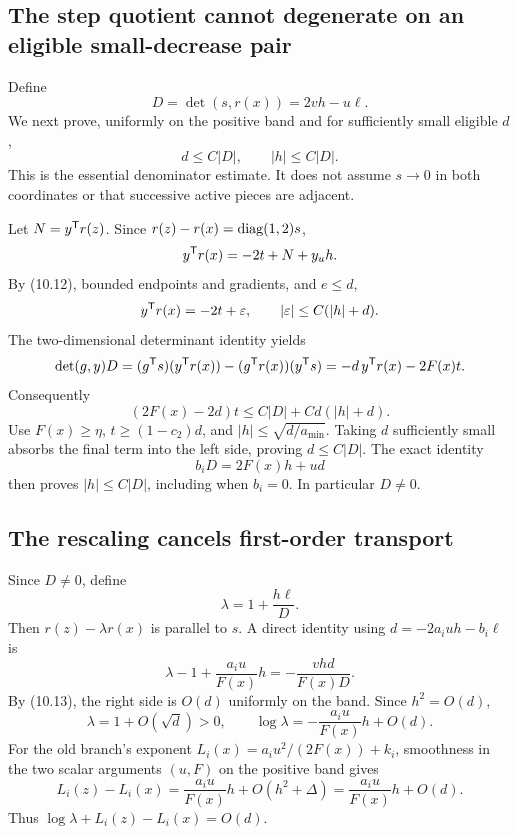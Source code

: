 

\subsection{The step quotient cannot degenerate on an eligible small-decrease pair}
Define
\[
 D=\det(s,r(x))=2vh-u\ell.
\]
We next prove, uniformly on the positive band and for sufficiently small eligible $d$,
\begin{equation}
 d\le C|D|,\qquad |h|\le C|D|. \tag{10.13}
\end{equation}
This is the essential denominator estimate. It does not assume $s\to0$ in both coordinates or that successive active pieces are adjacent.

Let $N=y^{\mathsf T} r(z)$. Since $r(z)-r(x)=\operatorname{diag}(1,2)s$,
\[
 y^{\mathsf T} r(x)=-2t+N+y_u h.
\]
By (10.12), bounded endpoints and gradients, and $e\le d$,
\[
 y^{\mathsf T} r(x)=-2t+\varepsilon,\qquad |\varepsilon|\le C(|h|+d).
\]
The two-dimensional determinant identity yields
\[
 \det(g,y)D=(g^{\mathsf T} s)(y^{\mathsf T} r(x))-(g^{\mathsf T} r(x))(y^{\mathsf T} s)
 =-d\,y^{\mathsf T} r(x)-2F(x)t.
\]
Consequently
\[
 (2F(x)-2d)t\le C|D|+Cd(|h|+d).
\]
Use $F(x)\ge\eta$, $t\ge(1-c_2)d$, and $|h|\le\sqrt{d/a_{\min}}$. Taking $d$ sufficiently small absorbs the final term into the left side, proving $d\le C|D|$. The exact identity
\begin{equation}
 b_iD=2F(x)h+ud \tag{10.14}
\end{equation}
then proves $|h|\le C|D|$, including when $b_i=0$. In particular $D\ne0$.



\subsection{The rescaling cancels first-order transport}
Since $D\ne0$, define
\[
 \lambda=1+\frac{h\ell}{D}.
\]
Then $r(z)-\lambda r(x)$ is parallel to $s$. A direct identity using $d=-2a_iuh-b_i\ell$ is
\begin{equation}
 \lambda-1+\frac{a_i u}{F(x)}h
 =-\frac{vhd}{F(x)D}. \tag{10.15}
\end{equation}
By (10.13), the right side is $O(d)$ uniformly on the band. Since $h^2=O(d)$,
\[
 \lambda=1+O(\sqrt d)>0,\qquad
 \log\lambda=-\frac{a_i u}{F(x)}h+O(d).
\]
For the old branch's exponent $L_i(x)=a_i u^2/(2F(x))+k_i$, smoothness in the two scalar arguments $(u,F)$ on the positive band gives
\[
 L_i(z)-L_i(x)=\frac{a_i u}{F(x)}h+O(h^2+\Delta)
 =\frac{a_i u}{F(x)}h+O(d).
\]
Thus $\log\lambda+L_i(z)-L_i(x)=O(d)$.

